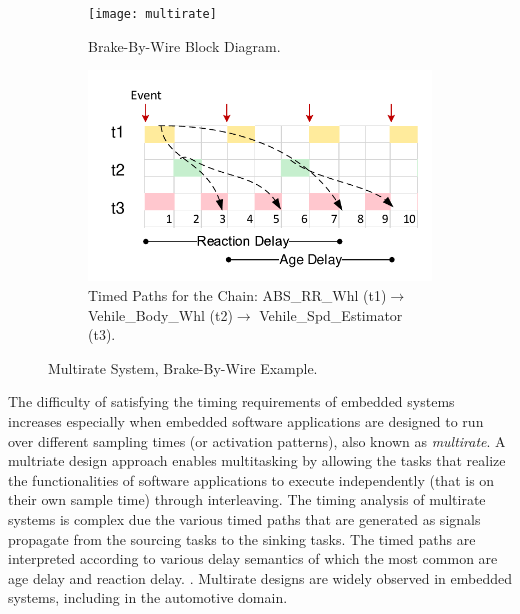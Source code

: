 \begin{figure}[h!]
  \centering
  \begin{subfigure}[b]{0.575\linewidth}
  \texttt{[image: multirate]}
  \caption{Brake-By-Wire Block Diagram.}
     \label{fig_smultirate}
  \end{subfigure}\vspace{-0.05cm}
  \begin{subfigure}[b]{0.4\linewidth}
    \includegraphics[width=\linewidth]{pics/timedpath.pdf}
    \caption{Timed Paths for the Chain: {\small ABS\_RR\_Whl (t1)$\rightarrow$ Vehile\_Body\_Whl  (t2)$\rightarrow$ Vehile\_Spd\_Estimator  (t3)}.}
    \label{fig_timedpath}
  \end{subfigure}
  \caption{Multirate System, Brake-By-Wire Example.}
  \label{fig_multirate}
\end{figure}

The difficulty of satisfying the timing requirements of embedded systems increases especially when embedded software applications are designed to run over different sampling times (or activation patterns), also known as \textit{multirate}. A multriate design approach enables multitasking by allowing the tasks that realize the functionalities of software applications to execute independently (that is on their own sample time) through interleaving. The timing analysis of multirate systems is complex due the various timed paths that are generated as signals propagate from the sourcing tasks to the sinking tasks. The timed paths are interpreted according to various delay semantics of which the most common are age delay and reaction delay. 
\cite{Feiertag2009ASemantics,mubeen2013support,Becker2017End-to-endSystems}. Multirate designs are widely observed in embedded systems, including in the automotive domain. 

